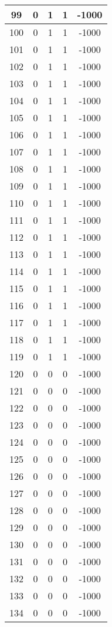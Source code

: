 \documentclass[letterpaper, 12pt]{article}
\begin{document}
\begin{longtable}{|c|c|c|c|c|}
\hline
99 & 0 & 1 & 1 & -1000 \\
\hline
100 & 0 & 1 & 1 & -1000 \\
\hline
101 & 0 & 1 & 1 & -1000 \\
\hline
102 & 0 & 1 & 1 & -1000 \\
\hline
103 & 0 & 1 & 1 & -1000 \\
\hline
104 & 0 & 1 & 1 & -1000 \\
\hline
105 & 0 & 1 & 1 & -1000 \\
\hline
106 & 0 & 1 & 1 & -1000 \\
\hline
107 & 0 & 1 & 1 & -1000 \\
\hline
108 & 0 & 1 & 1 & -1000 \\
\hline
109 & 0 & 1 & 1 & -1000 \\
\hline
110 & 0 & 1 & 1 & -1000 \\
\hline
111 & 0 & 1 & 1 & -1000 \\
\hline
112 & 0 & 1 & 1 & -1000 \\
\hline
113 & 0 & 1 & 1 & -1000 \\
\hline
114 & 0 & 1 & 1 & -1000 \\
\hline
115 & 0 & 1 & 1 & -1000 \\
\hline
116 & 0 & 1 & 1 & -1000 \\
\hline
117 & 0 & 1 & 1 & -1000 \\
\hline
118 & 0 & 1 & 1 & -1000 \\
\hline
119 & 0 & 1 & 1 & -1000 \\
\hline
120 & 0 & 0 & 0 & -1000 \\
\hline
121 & 0 & 0 & 0 & -1000 \\
\hline
122 & 0 & 0 & 0 & -1000 \\
\hline
123 & 0 & 0 & 0 & -1000 \\
\hline
124 & 0 & 0 & 0 & -1000 \\
\hline
125 & 0 & 0 & 0 & -1000 \\
\hline
126 & 0 & 0 & 0 & -1000 \\
\hline
127 & 0 & 0 & 0 & -1000 \\
\hline
128 & 0 & 0 & 0 & -1000 \\
\hline
129 & 0 & 0 & 0 & -1000 \\
\hline
130 & 0 & 0 & 0 & -1000 \\
\hline
131 & 0 & 0 & 0 & -1000 \\
\hline
132 & 0 & 0 & 0 & -1000 \\
\hline
133 & 0 & 0 & 0 & -1000 \\
\hline
134 & 0 & 0 & 0 & -1000 \\

\end{longtable}
\end{document}
